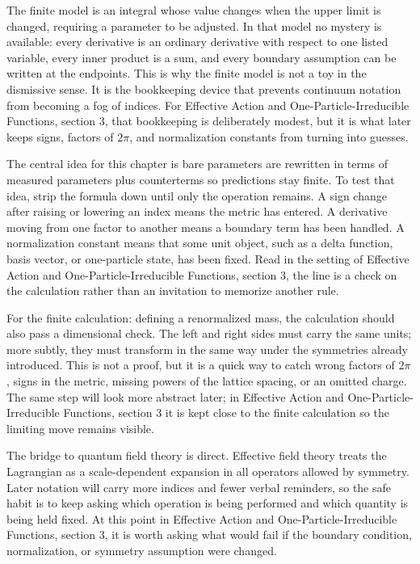 The finite model is an integral whose value changes when the upper limit is changed, requiring a parameter to be adjusted.  In that model no mystery is available: every derivative is an ordinary derivative with respect to one listed variable, every inner product is a sum, and every boundary assumption can be written at the endpoints.  This is why the finite model is not a toy in the dismissive sense.  It is the bookkeeping device that prevents continuum notation from becoming a fog of indices.  For Effective Action and One-Particle-Irreducible Functions, section 3, that bookkeeping is deliberately modest, but it is what later keeps signs, factors of \(2\pi\), and normalization constants from turning into guesses.

The central idea for this chapter is bare parameters are rewritten in terms of measured parameters plus counterterms so predictions stay finite.  To test that idea, strip the formula down until only the operation remains.  A sign change after raising or lowering an index means the metric has entered.  A derivative moving from one factor to another means a boundary term has been handled.  A normalization constant means that some unit object, such as a delta function, basis vector, or one-particle state, has been fixed.  Read in the setting of Effective Action and One-Particle-Irreducible Functions, section 3, the line is a check on the calculation rather than an invitation to memorize another rule.

For the finite calculation: defining a renormalized mass, the calculation should also pass a dimensional check.  The left and right sides must carry the same units; more subtly, they must transform in the same way under the symmetries already introduced.  This is not a proof, but it is a quick way to catch wrong factors of \(2\pi\), signs in the metric, missing powers of the lattice spacing, or an omitted charge.  The same step will look more abstract later; in Effective Action and One-Particle-Irreducible Functions, section 3 it is kept close to the finite calculation so the limiting move remains visible.

The bridge to quantum field theory is direct.  Effective field theory treats the Lagrangian as a scale-dependent expansion in all operators allowed by symmetry.  Later notation will carry more indices and fewer verbal reminders, so the safe habit is to keep asking which operation is being performed and which quantity is being held fixed.  At this point in Effective Action and One-Particle-Irreducible Functions, section 3, it is worth asking what would fail if the boundary condition, normalization, or symmetry assumption were changed.

